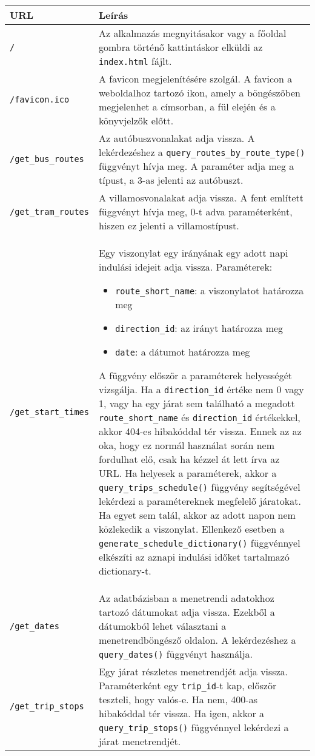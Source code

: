 \begin{longtable}{|p{4.5cm}|p{9cm}|}
\hline
\textbf{URL} & \textbf{Leírás} \\
\hline
\texttt{/} &
Az alkalmazás megnyitásakor vagy a főoldal gombra történő kattintáskor elküldi az \texttt{index.html} fájlt. \\
\hline
\texttt{/favicon.ico} &
A favicon megjelenítésére szolgál. A favicon a weboldalhoz tartozó ikon, amely a böngészőben megjelenhet a címsorban, a fül elején és a könyvjelzők előtt. \\
\hline
\texttt{/get\_bus\_routes} &
Az autóbuszvonalakat adja vissza. A lekérdezéshez a \texttt{query\_routes\_by\_route\_type()} függvényt hívja meg. A paraméter adja meg a típust, a 3-as jelenti az autóbuszt. \\
\hline
\texttt{/get\_tram\_routes} &
A villamosvonalakat adja vissza. A fent említett függvényt hívja meg, 0-t adva paraméterként, hiszen ez jelenti a villamostípust. \\
\hline
\texttt{/get\_start\_times} &
Egy viszonylat egy irányának egy adott napi indulási idejeit adja vissza.
Paraméterek:
\begin{itemize}
\item \texttt{route\_short\_name}: a viszonylatot határozza meg
\item \texttt{direction\_id}: az irányt határozza meg
\item \texttt{date}: a dátumot határozza meg
\end{itemize}
A függvény először a paraméterek helyességét vizsgálja. Ha a \texttt{direction\_id} értéke nem 0 vagy 1, vagy ha egy járat sem található a megadott \texttt{route\_short\_name} és \texttt{direction\_id} értékekkel, akkor 404-es hibakóddal tér vissza. Ennek az az oka, hogy ez normál használat során nem fordulhat elő, csak ha kézzel át lett írva az URL.
Ha helyesek a paraméterek, akkor a \texttt{query\_trips\_schedule()} függvény segítségével lekérdezi a paramétereknek megfelelő járatokat. Ha egyet sem talál, akkor az adott napon nem közlekedik a viszonylat. Ellenkező esetben a \texttt{generate\_schedule\_dictionary()}  függvénnyel elkészíti az aznapi indulási időket tartalmazó dictionary-t. \\
\hline
\texttt{/get\_dates} &
Az adatbázisban a menetrendi adatokhoz tartozó dátumokat adja vissza. Ezekből a dátumokból lehet választani a menetrendböngésző oldalon. A lekérdezéshez a \texttt{query\_dates()} függvényt használja.  \\
\hline
\texttt{/get\_trip\_stops} &
Egy járat részletes menetrendjét adja vissza. Paraméterként egy \texttt{trip\_id}-t kap, először teszteli, hogy valós-e. Ha nem, 400-as hibakóddal tér vissza. Ha igen, akkor a \texttt{query\_trip\_stops()} függvénnyel lekérdezi a járat menetrendjét.  \\

\end{longtable}
